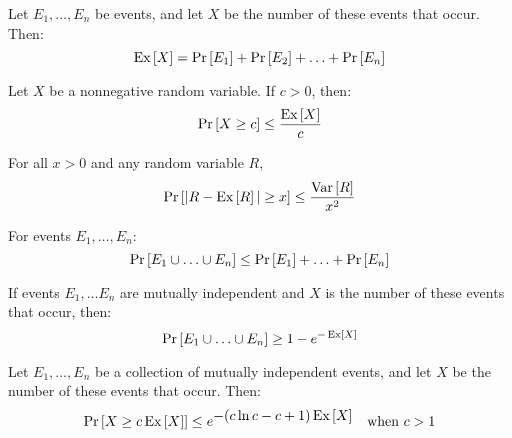 \documentclass[12pt]{article}
\newcommand{\var}[1]{\Var\left[#1\right]}
\begin{document}
\renewcommand{\pr}[1]{\mathop{\textup{Pr}}\nolimits\left[#1\right]}
\newcommand{\prsub}[2]{\mathop{\textup{Pr}_{#1}}\nolimits\left[#2\right]}
\renewcommand{\ex}[1]{\mathop{\textup{Ex}}\nolimits\left[#1\right]}
\renewcommand{\ex}[1]{\mathop{\textup{Ex}}\nolimits\left[#1\right]}



\begin{theorem}
\label{th:num-events}
Let $E_1, \ldots, E_n$ be events, and let $X$ be the number of these
events that occur. Then:
%
\[
\ex{X} = \pr{E_1} + \pr{E_2} + \ldots + \pr{E_n}
\]
\end{theorem}

\begin{theorem}
\label{th:markov}
Let $X$ be a nonnegative random variable.  If $c > 0$, then:
%
\[
\pr{X \geq c} \leq \frac{\ex{X}}{c}
\]
\end{theorem}

\begin{theorem}
\label{th:chebyshev}
For all $x > 0$ and any random variable $R$,
$$\pr{|R-\ex{R}| \geq x} \leq \frac{\var{R}}{x^2}$$
\end{theorem}

\begin{theorem}
\label{th:union}
For events $E_1, \ldots, E_n$:
%
\[
\pr{E_1 \cup \ldots \cup E_n} \leq \pr{E_1} + \ldots + \pr{E_n}
\]
\end{theorem}

\begin{theorem}
\label{th:murphy}
If events $E_1, \ldots E_n$ are mutually independent and $X$ is the
number of these events that occur, then:
%
\[
\pr{E_1 \cup \ldots \cup E_n} \geq 1 - e^{-\ex{X}}
\]
\end{theorem}

\begin{theorem}
\label{th:chernoff}
Let $E_1, \ldots, E_n$ be a collection of mutually independent events,
and let $X$ be the number of these events that occur.  Then:
%
\begin{align*}
\pr{X \geq c \ex{X}} & \leq e^{\textstyle -(c \ln c - c + 1) \ex{X}}
    & \text{when $c > 1$}
\end{align*}
\end{theorem}

\end{document}
